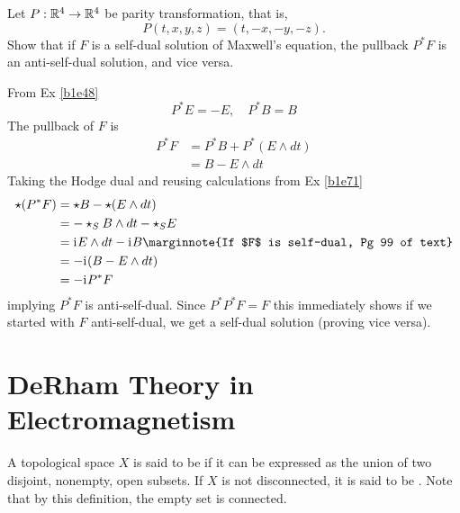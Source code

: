 \documentclass[10pt]{article}
\begin{document}
\begin{example}
	Let $P:\mathbb{R}^4 \to \mathbb{R}^4$ be parity transformation, that is,
	$$
		P(t,x,y,z) = (t,-x,-y,-z).
	$$
	Show that if $F$ is a self-dual solution of Maxwell's equation, the pullback $P^*F$ is an anti-self-dual solution, and vice versa.
\end{example}
\sol From Ex \ref{b1e48}
$$
P^*E=-E,\quad P^*B=B
$$
The pullback of $F$ is
$$
\begin{aligned}
	P^*F &= P^*B+P^*(E\wedge dt)\\
	&= B - E\wedge dt
\end{aligned}
$$
Taking the Hodge dual and reusing calculations from Ex \ref{b1e71}
$$
\begin{aligned}
	\star(P^*F) &= \star B - \star(E\wedge dt)\\
	&= -\star_S B \wedge dt - \star_SE\\
	&= \di E \wedge dt - \di B\marginnote{If $F$ is self-dual, Pg 99 of text}\\
	&= -\di(B - E\wedge dt)\\
	&= -\di P^*F
\end{aligned}
$$
implying $P^*F$ is anti-self-dual. Since $P^*P^*F = F$ this immediately shows if we started with $F$ anti-self-dual, we get a self-dual solution (proving vice versa).



\newpage
\section{DeRham Theory in Electromagnetism}\label{b1c6}



\begin{definition}
	A topological space $X$ is said to be  if it can be expressed as the union of two disjoint, nonempty, open subsets. If $X$ is not disconnected, it is said to be . Note that by this definition, the empty set is connected.
\end{definition}
\end{document}
